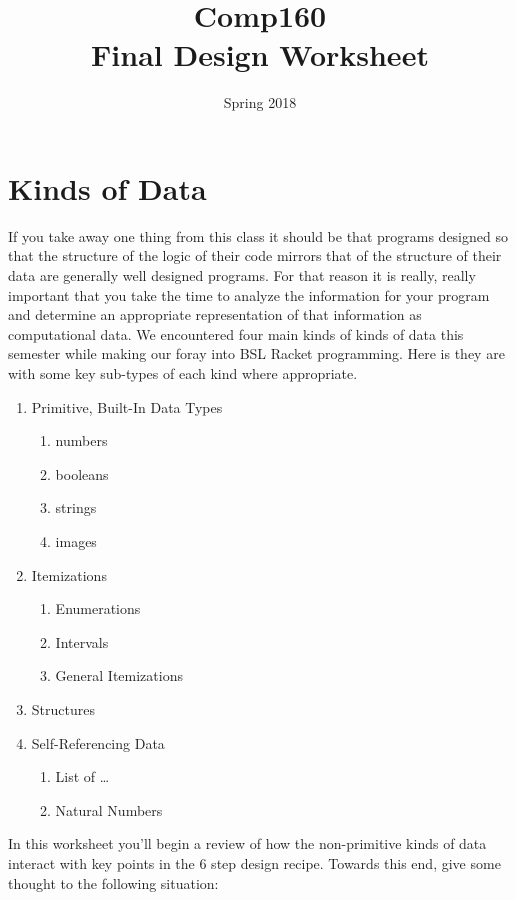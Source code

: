 \documentclass{article}
\title{Comp160 \\ Final Design Worksheet }
\author{}
\date{ Spring 2018 }
\begin{document}
\maketitle

\section*{Kinds of Data}

If you take away one thing from this class it should be that programs designed so that the structure of the logic of their code mirrors that of the structure of their data are generally well designed programs. For that reason it is really, really important that you take the time to analyze the information for your program and determine an appropriate representation of that information as computational data. We encountered four main kinds of kinds of data this semester while making our foray into BSL Racket programming. Here is they are with some key sub-types of each kind where appropriate.

    \begin{enumerate}
      \item Primitive, Built-In Data Types
      \begin{enumerate}
        \item numbers
        \item booleans
        \item strings
        \item images
      \end{enumerate}
      \item Itemizations
      \begin{enumerate}
        \item Enumerations
        \item Intervals
        \item General Itemizations
      \end{enumerate}
      \item Structures
      \item Self-Referencing Data
      \begin{enumerate}
        \item List of \ldots
        \item Natural Numbers
      \end{enumerate}
    \end{enumerate}

In this worksheet you'll begin a review of how the non-primitive kinds of data interact with key points in the 6 step design recipe. Towards this end, give some thought to the following situation:
\end{document}
